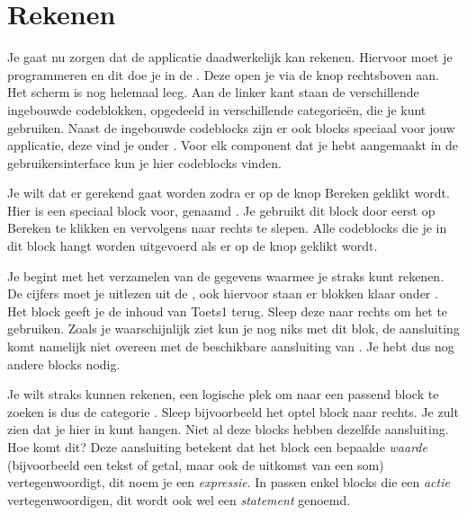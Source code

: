 \section{Rekenen}
Je gaat nu zorgen dat de applicatie daadwerkelijk kan rekenen. Hiervoor moet je programmeren en dit doe je in de . Deze open je via de knop  rechtsboven aan. Het scherm is nog helemaal leeg. Aan de linker kant staan de verschillende ingebouwde codeblokken, opgedeeld in verschillende categorie\"en, die je kunt gebruiken. Naast de ingebouwde codeblocks zijn er ook blocks speciaal voor jouw applicatie, deze vind je onder . Voor elk component dat je hebt aangemaakt in de gebruikersinterface kun je hier codeblocks vinden.

Je wilt dat er gerekend gaat worden zodra er op de knop Bereken geklikt wordt. Hier is een speciaal block voor, genaamd . Je gebruikt dit block door eerst op Bereken te klikken en vervolgens  naar rechts te slepen. Alle codeblocks die je in dit block hangt worden uitgevoerd als er op de knop geklikt wordt.

Je begint met het verzamelen van de gegevens waarmee je straks kunt rekenen. De cijfers moet je uitlezen uit de , ook hiervoor staan er blokken klaar onder . Het block  geeft je de inhoud van Toets1 terug. Sleep deze naar rechts om het te gebruiken. Zoals je waarschijnlijk ziet kun je nog niks met dit blok, de aansluiting komt namelijk niet overeen met de beschikbare aansluiting van . Je hebt dus nog andere blocks nodig.

Je wilt straks kunnen rekenen, een logische plek om naar een passend block te zoeken is dus de categorie . Sleep bijvoorbeeld het optel block naar rechts. Je zult zien dat je hier  in kunt hangen. Niet al deze blocks hebben dezelfde aansluiting. Hoe komt dit? Deze aansluiting betekent dat het block een bepaalde \emph{waarde} (bijvoorbeeld een tekst of getal, maar ook de uitkomst van een som) vertegenwoordigt, dit noem je een \emph{expressie}. In  passen enkel blocks die een \emph{actie} vertegenwoordigen, dit wordt ook wel een \emph{statement} genoemd. 

